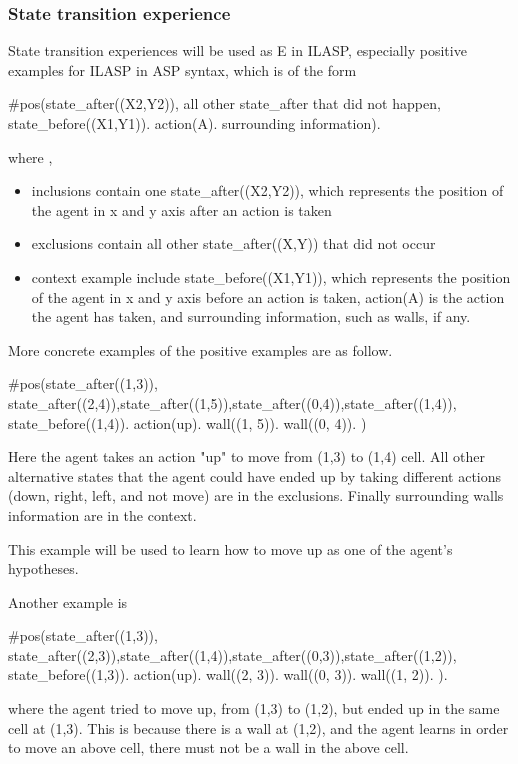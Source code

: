 \subsubsection{State transition experience}
State transition experiences will be used as E in ILASP, especially positive examples for ILASP in ASP syntax, which is of the form

\#pos({state\_after((X2,Y2))}, {all other state\_after that did not happen}, {state\_before((X1,Y1)). action(A). surrounding information}).

where ,  
\begin{itemize}
    \item inclusions contain one state\_after((X2,Y2)), which represents the position of the agent in x and y axis after an action is taken 
    \item exclusions contain all other state\_after((X,Y)) that did not occur
    \item context example include state\_before((X1,Y1)), which represents the position of the agent in x and y axis before an action is taken,
    action(A) is the action the agent has taken, and surrounding information, such as walls, if any. 
\end{itemize}

More concrete examples of the positive examples are as follow. 

\#pos({state\_after((1,3))}, {state\_after((2,4)),state\_after((1,5)),state\_after((0,4)),state\_after((1,4))}, {state\_before((1,4)). action(up). wall((1, 5)). wall((0, 4)). })

Here the agent takes an action "up" to move from (1,3) to (1,4) cell. All other alternative states that the agent could have ended up by taking different actions 
(down, right, left, and not move) are in the exclusions. Finally surrounding walls information are in the context.

This example will be used to learn how to move up as one of the agent's hypotheses.

Another example is 

\#pos({state\_after((1,3))}, {state\_after((2,3)),state\_after((1,4)),state\_after((0,3)),state\_after((1,2))}, {state\_before((1,3)). action(up). wall((2, 3)). wall((0, 3)). wall((1, 2)). }).

where the agent tried to move up, from (1,3) to (1,2), but ended up in the same cell at (1,3). This is because there is a wall at (1,2), and the agent learns in order to move an above cell,
there must not be a wall in the above cell. 

